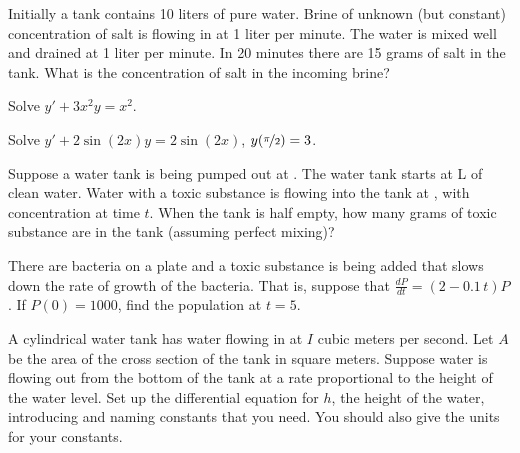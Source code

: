 \begin{exercise}
Initially a tank contains 10 liters of pure water.
Brine of unknown (but constant) concentration
of salt is flowing in at 1 liter per minute.
The water is mixed well and drained at 1 liter per minute.
In 20 minutes there are 15 grams of salt in the tank.  What is the
concentration of salt in the incoming brine?
\end{exercise}

\setcounter{exercise}{100}

\begin{exercise}
Solve $y'+3 x^2 y = x^2$.
\end{exercise}

\begin{exercise}
Solve $y'+ 2\sin(2x) y = 2\sin(2x)$, $y(\nicefrac{\pi}{2}) = 3$.
\end{exercise}

\begin{exercise}
Suppose a water tank is being pumped out at .  The
water tank starts at \unit[10]{L} of clean water.
Water with
a toxic substance is flowing into the tank at ,
with concentration  at time $t$.
When the tank is half empty, how many grams of toxic substance are in the
tank (assuming perfect mixing)?
\end{exercise}

\begin{exercise}
There are bacteria on a plate and a toxic substance is being added that slows
down the rate of growth of the bacteria.
That is,
suppose that $\frac{dP}{dt} = (2-0.1\,t)P$.  If $P(0) = 1000$, find
the population at $t=5$.
\end{exercise}

\begin{exercise}
A cylindrical water tank has water flowing in at $I$ cubic meters
per second.
Let $A$ be the area of the cross section of the tank in square meters.
Suppose water is
flowing out from the bottom of the tank at a rate proportional to the height of
the water level.  Set up the differential equation for $h$, the height of the
water, introducing and naming
constants that you need.  You should also give the units for your constants.
\end{exercise}

